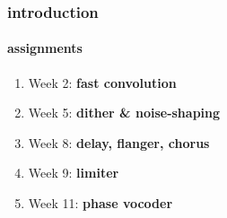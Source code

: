 \begin{frame}\frametitle{introduction}\framesubtitle{assignments}
    \begin{enumerate}
        \item   Week 2: \textbf{fast convolution}
        \smallskip
        \item   Week 5: \textbf{dither \& noise-shaping}
        \smallskip
        \item   Week 8: \textbf{delay, flanger, chorus}
        \smallskip
        \item   Week 9: \textbf{limiter}
        \smallskip
        \item   Week 11: \textbf{phase vocoder}
    \end{enumerate}
\end{frame}
